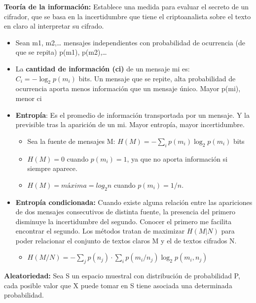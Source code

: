 \documentclass[12pt, twoside, openright]{report} %
\begin{document}
  
  \textbf{Teoría de la información:} Establece una medida para evaluar
  el secreto de un cifrador, que se basa en la incertidumbre que tiene
  el criptoanalista sobre el texto en claro al interpretar su cifrado.
  

  \begin{itemize}
  \item Sean m1, m2,\ldots{} mensajes independientes con probabilidad de
    ocurrencia (de que se repita) p(m1), p(m2),\ldots{}
    
  \item La \textbf{cantidad de información (ci)} de un mensaje mi es: $C_i=-\log_2 p(m_i)$ bits. Un
    mensaje que se repite, alta probabilidad de ocurrencia aporta menos
    información que un mensaje único. Mayor p(mi), menor ci
    
  \item \textbf{Entropía}: Es el promedio de información transportada por un
    mensaje. Y la previsible tras la aparición de un mi. Mayor entropía,
    mayor incertidumbre.
    
    \begin{itemize}
    \item Sea la fuente de mensajes M: $H(M)=-\sum\limits_i p(m_i) \log_2 p(m_i)$ bits
      
    \item $H(M)=0$ cuando $p(m_i)=1$, ya que no aporta información si siempre
      aparece.
      
    \item $H(M)=máxima=log_2 n$ cuando $p(m_i)=1/n$.
      
    \end{itemize}
  \item \textbf{Entropía condicionada:} Cuando existe alguna relación entre
    las apariciones de dos mensajes consecutivos de distinta fuente, la
    presencia del primero disminuye la incertidumbre del segundo.
    Conocer el primero me facilita encontrar el segundo. Los métodos
    tratan de maximizar $H(M| N)$ para poder relacionar el conjunto
    de textos claros M y el de textos cifrados N.
 
    \begin{itemize}
    \item $H(M/N) =-\sum\limits_j p(n_j)\cdot \sum\limits_i p(m_i/n_j) \log_2 p(m_i, n_j)$
      
    \end{itemize}
  \end{itemize}

  
  \textbf{Aleatoriedad:} Sea S un espacio muestral con distribución de
  probabilidad P, cada posible valor que X puede tomar en S tiene
  asociada una determinada probabilidad.
  
\end{document}
